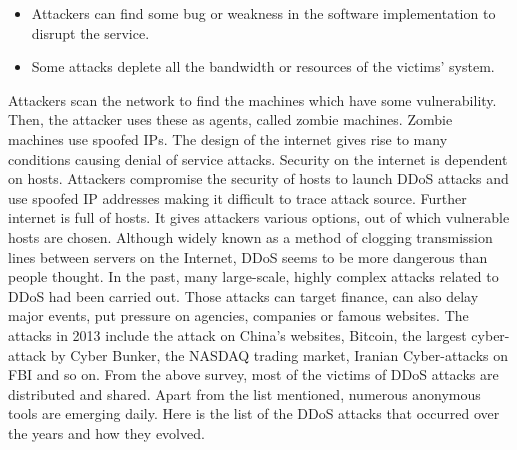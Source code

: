 \documentclass[twocolumn]{article}
\begin{document}
\begin{itemize}
\item Attackers can find some bug or weakness in the software implementation to disrupt the service.
\item Some attacks deplete all the bandwidth or resources of the victims' system.
\end{itemize}
Attackers scan the network to find the machines which have some vulnerability. Then, the attacker uses these as agents, called zombie machines. Zombie machines use spoofed IPs. The design of the internet gives rise to many conditions causing denial of service attacks. Security on the internet is dependent on hosts. Attackers compromise the security of hosts to launch DDoS
attacks and use spoofed IP addresses making it difficult to trace attack source. Further internet is full of hosts. It
gives attackers various options, out of which vulnerable hosts are chosen\cite{deshmukh2015understanding}. Although widely known as a method of clogging transmission lines between servers on the Internet, DDoS seems to be more dangerous than people thought. In the past, many large-scale, highly complex attacks related to DDoS had been carried out. Those attacks can target finance, can also delay major events, put pressure on agencies, companies or famous websites. The attacks in 2013 include the attack on China’s websites, Bitcoin, the largest cyber-attack by Cyber Bunker, the NASDAQ trading market, Iranian Cyber-attacks on FBI and so on. From the above survey, most of the victims of DDoS
attacks are distributed and shared. Apart from the list mentioned, numerous anonymous tools are emerging daily. Here is the list of the DDoS attacks that occurred over the years and how they evolved.
\end{document}
